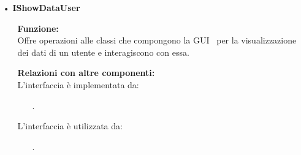 {\begin{sloppypar}
{\begin{itemize}
\begin{itemize}
			\item[] \textbf{Metodi:}\\
				\texttt{+ void loadViewUserData();}\\
				Visualizza la GUI\g~ che permette all'utente di visualizzare i propri dati.\\
				
				\texttt{+ void removeViewUserData();}\\
				Nasconde la GUI\g~ di visualizzazione e modifica dati.\\
				
				\texttt{+ void errorView(Vector<String> messages);}\\
				Imposta e rende visibili i messaggi di errore da segnalare all’utente.\\
				
				\texttt{+ void setLabel(Vector<String> data);}\\
				Imposta i campi dei dati dell'utente estrapolati dal vettore \texttt{data}.\\
				
				\texttt{+ void windowClosing();}\\
				Gestisce l'evento di chiusura della finestra della GUI\g~ di gestione dei dati utente effettuando il logout.\\
		\end{itemize}
		
		\item[•] \textbf{IShowDataUser}
		\begin{itemize}
			\item[] \textbf{Funzione:}\\
				  Offre operazioni alle classi che compongono la GUI\g~ per la visualizzazione dei dati di un utente e interagiscono con essa.\\
				
			\item[] \textbf{Relazioni con altre componenti:}\\
				L'interfaccia è implementata da:
				\begin{itemize}
					\item[] . 
				\end{itemize}
				L'interfaccia è utilizzata da:
				\begin{itemize}
					\item[] . 
				\end{itemize}
				

\end{itemize}
\end{itemize}}
\end{sloppypar}}
